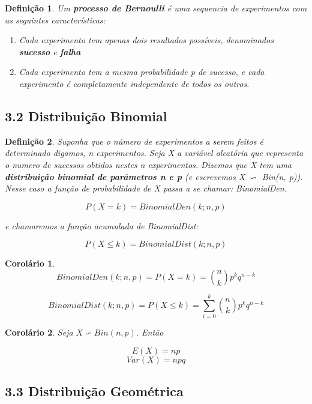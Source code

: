 \documentclass[12pt]{article}
\newtheorem{corollary}{Corolário}[theorem]
\newtheorem{definition}{Definição}
\begin{document}
\begin{definition}
    Um \textbf{processo de Bernoulli} é uma sequencia de experimentos com as seguintes características:
    
    \begin{enumerate}
        \item Cada experimento tem apenas dois resultados possíveis, denominados \textbf{sucesso} e \textbf{falha}
        
        \item Cada experimento tem a mesma probabilidade p de sucesso, e cada experimento é completamente independente de todos os outros.
    \end{enumerate}
\end{definition}

\subsection*{3.2 Distribuição Binomial}
\label{s12}

\begin{definition}
    Suponha que o número de experimentos a serem feitos é determinado digamos, n experimentos. Seja X a variável aleatória que representa o numero de sucessos obtidos nestes n experimentos. Dizemos que X tem uma \textbf{distribuição binomial de parâmetros n e p} (e escrevemos X $\backsim$ Bin(n, p)). Nesse caso a função de probabilidade de X passa a se chamar: BinomialDen.
    
    $$P(X = k) = BinomialDen (k; n, p)$$
    
    e chamaremos a função acumulada de BinomialDist:
    
    $$P(X \leq k) = BinomialDist (k; n, p)$$
\end{definition}

\begin{corollary}
    $$BinomialDen (k;n, p) = P(X = k) = {n \choose k} p^k q^{n-k}$$
    
    $$BinomialDist (k;n, p) = P(X \leq k) = \sum_{i = 0}^k {n \choose k} p^k q^{n - k}$$
\end{corollary}

\begin{corollary}
    Seja $X \backsim Bin (n, p)$. Então
    
    $$E(X) = n p$$
    $$Var (X) = n p q$$
\end{corollary}

\subsection*{3.3 Distribuição Geométrica}
\label{s13}
\end{document}
